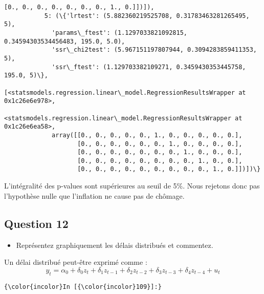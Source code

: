 \documentclass[11pt]{article}
\providecommand{\tightlist}{%
      \setlength{\itemsep}{0pt}\setlength{\parskip}{0pt}}
\begin{document}
\begin{Verbatim}[commandchars=\\\{\}]
                    [0., 0., 0., 0., 0., 0., 0., 1., 0.]])]),
           5: (\{'lrtest': (5.882360219525708, 0.31783463281265495, 5),
             'params\_ftest': (1.1297033821092815, 0.34594303534456483, 195.0, 5.0),
             'ssr\_chi2test': (5.967151197807944, 0.3094283859411353, 5),
             'ssr\_ftest': (1.129703382109271, 0.3459430353445758, 195.0, 5)\},
            [<statsmodels.regression.linear\_model.RegressionResultsWrapper at 0x1c26e6e978>,
             <statsmodels.regression.linear\_model.RegressionResultsWrapper at 0x1c26e6ea58>,
             array([[0., 0., 0., 0., 0., 1., 0., 0., 0., 0., 0.],
                    [0., 0., 0., 0., 0., 0., 1., 0., 0., 0., 0.],
                    [0., 0., 0., 0., 0., 0., 0., 1., 0., 0., 0.],
                    [0., 0., 0., 0., 0., 0., 0., 0., 1., 0., 0.],
                    [0., 0., 0., 0., 0., 0., 0., 0., 0., 1., 0.]])])\}
\end{Verbatim}
            
    L'intégralité des p-values sont supérieures au seuil de 5\%. Nous
rejetons donc pas l'hypothèse nulle que l'inflation ne cause pas de
chômage.

    \subsection{Question 12}\label{question-12}

\begin{itemize}
\tightlist
\item
  Représentez graphiquement les délais distribués et commentez. 
\end{itemize}

    Un délai distribué peut-être exprimé comme :
\[ y_t = \alpha_0 + \delta_0 z_t + \delta_1 z_{t-1} + \delta_2 z_{t-2} + \delta_3 z_{t-3} + \delta_4 z_{t-4} + u_t \]

    \begin{Verbatim}[commandchars=\\\{\}]
{\color{incolor}In [{\color{incolor}109}]:} 
\end{Verbatim}
\end{document}
